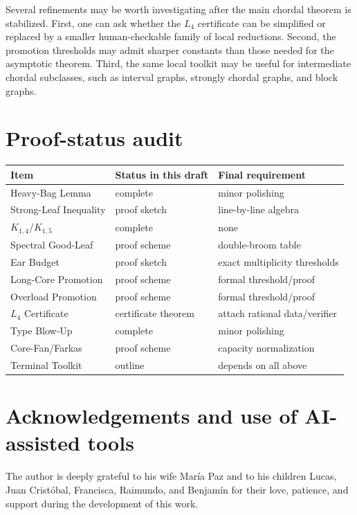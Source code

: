 \documentclass[11pt]{article}
\theoremstyle{definition}
\begin{document}
Several refinements may be worth investigating after the main chordal theorem is stabilized. First, one can ask whether the \(L_4\) certificate can be simplified or replaced by a smaller human-checkable family of local reductions. Second, the promotion thresholds may admit sharper constants than those needed for the asymptotic theorem. Third, the same local toolkit may be useful for intermediate chordal subclasses, such as interval graphs, strongly chordal graphs, and block graphs.

\section{Proof-status audit}

\begin{center}
\begin{tabular}{lll}
\toprule
Item & Status in this draft & Final requirement\\
\midrule
Heavy-Bag Lemma & complete & minor polishing\\
Strong-Leaf Inequality & proof sketch & line-by-line algebra\\
\(K_{1,4}/K_{1,5}\) & complete & none\\
Spectral Good-Leaf & proof scheme & double-broom table\\
Ear Budget & proof sketch & exact multiplicity thresholds\\
Long-Core Promotion & proof scheme & formal threshold/proof\\
Overload Promotion & proof scheme & formal threshold/proof\\
\(L_4\) Certificate & certificate theorem & attach rational data/verifier\\
Type Blow-Up & complete & minor polishing\\
Core-Fan/Farkas & proof scheme & capacity normalization\\
Terminal Toolkit & outline & depends on all above\\
\bottomrule
\end{tabular}
\end{center}

\section*{Acknowledgements and use of AI-assisted tools}

The author is deeply grateful to his wife María Paz and to his children Lucas, Juan Cristóbal, Francisca, Raimundo, and Benjamín for their love, patience, and support during the development of this work.
\end{document}
